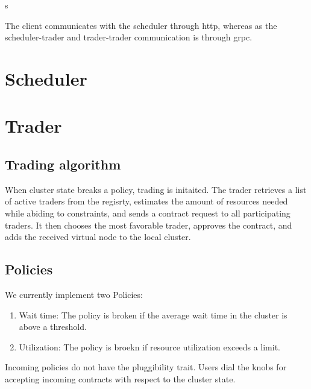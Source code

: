 
s


The client communicates with the scheduler through http, whereas as the
scheduler-trader and trader-trader communication is through grpc. 

\section{Scheduler} 
\section{Trader}


\subsection{Trading algorithm}

When cluster state breaks a policy, trading is initaited. The trader retrieves
a list of active traders from the regisrty, estimates the amount of resources
needed while abiding to constraints, and sends a contract request to all
participating traders. It then chooses the most favorable trader, approves the
contract, and adds the received virtual node to the local cluster. 

\subsection{Policies}




We currently implement two Policies:
\begin{enumerate}
  \item Wait time: The policy is broken if the average wait time in the cluster
    is above a threshold.
  \item Utilization: The policy is broekn if resource utilization exceeds a
    limit. 
\end{enumerate}

Incoming policies do not have the pluggibility trait. Users dial the knobs for
accepting incoming contracts with respect to the cluster state.
